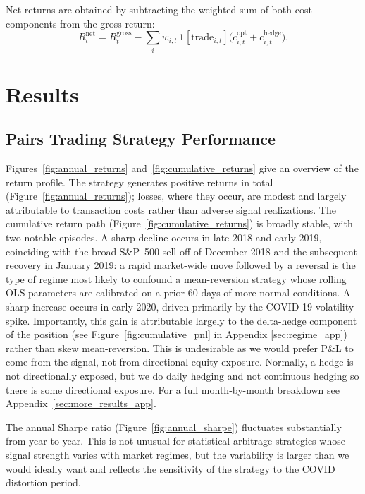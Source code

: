 \documentclass[12pt, a4paper]{article}
\begin{document}
Net returns are obtained by subtracting the weighted sum of both cost components from the gross return:
\begin{equation}
    R_t^{\mathrm{net}}
    = R_t^{\mathrm{gross}}
      - \sum_i w_{i,t}\,\mathbf{1}[\text{trade}_{i,t}]
        \bigl(c^{\mathrm{opt}}_{i,t} + c^{\mathrm{hedge}}_{i,t}\bigr).
    \label{eq:net_return}
\end{equation}

\section{Results}
\label{sec:results}

\subsection{Pairs Trading Strategy Performance}

Figures~\ref{fig:annual_returns} and~\ref{fig:cumulative_returns} give an overview of the return profile. The strategy generates positive returns in total (Figure~\ref{fig:annual_returns}); losses, where they occur, are modest and largely attributable to transaction costs rather than adverse signal realizations. The cumulative return path (Figure~\ref{fig:cumulative_returns}) is broadly stable, with two notable episodes. A sharp decline occurs in late 2018 and early 2019, coinciding with the broad S\&P~500 sell-off of December 2018 and the subsequent recovery in January 2019: a rapid market-wide move followed by a reversal is the type of regime most likely to confound a mean-reversion strategy whose rolling OLS parameters are calibrated on a prior 60 days of more normal conditions. A sharp increase occurs in early 2020, driven primarily by the COVID-19 volatility spike. Importantly, this gain is attributable largely to the delta-hedge component of the position (see Figure~\ref{fig:cumulative_pnl} in Appendix \ref{sec:regime_app}) rather than skew mean-reversion. This is undesirable as we would prefer P\&L to come from the signal, not from directional equity exposure. Normally, a hedge is not directionally exposed, but we do daily hedging and not continuous hedging so there is some directional exposure. For a full month-by-month breakdown see Appendix~\ref{sec:more_results_app}.

The annual Sharpe ratio (Figure~\ref{fig:annual_sharpe}) fluctuates substantially from year to year. This is not unusual for statistical arbitrage strategies whose signal strength varies with market regimes, but the variability is larger than we would ideally want and reflects the sensitivity of the strategy to the COVID distortion period.
\end{document}
